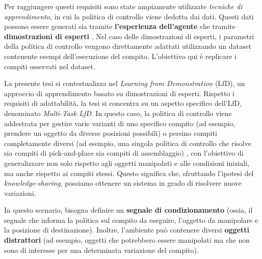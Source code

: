 Per raggiungere questi requisiti sono state ampiamente utilizzate \textit{tecniche di apprendimento}, in cui la politica di controllo viene dedotta dai dati. Questi dati possono essere generati sia tramite \textbf{l'esperienza dell'agente} \cite{sutton2018reinforcement} che tramite \textbf{dimostrazioni di esperti} \cite{osa2018algorithmic}.
Nel caso delle dimostrazioni di esperti, i parametri della politica di controllo vengono direttamente adattati utilizzando un dataset contenente esempi dell'esecuzione del compito. L'obiettivo qui è replicare i compiti osservati nel dataset.

La presente tesi si contestualizza nel \textit{Learning from Demonstration} (LfD), un approccio di apprendimento basato su dimostrazioni di esperti. Rispetto i requisiti di adattabilità, la tesi si concentra su un aspetto specifico dell'LfD, denominato \textit{Multi-Task LfD}. In questo caso, la politica di controllo viene addestrata per gestire varie varianti di uno specifico compito (ad esempio, prendere un oggetto da diverse posizioni possibili) \cite{dasari2021transformers_one_shot} o persino compiti completamente diversi (ad esempio, una singola politica di controllo che risolve sia compiti di pick-and-place sia compiti di assemblaggio) \cite{brohan2022rt,mandi2022towards_more_generalizable_one_shot}, con l'obiettivo di generalizzare non solo rispetto agli oggetti manipolati e alle condizioni iniziali, ma anche rispetto ai compiti stessi. Questo significa che, sfruttando l'ipotesi del \textit{knowledge-sharing}, possiamo ottenere un sistema in grado di risolvere nuove variazioni.


In questo scenario, bisogna definire un \textbf{segnale di condizionamento} (ossia, il segnale che informa la politica sul compito da eseguire, l'oggetto da manipolare e la posizione di destinazione). Inoltre, l'ambiente può contenere diversi \textbf{oggetti distrattori} (ad esempio, oggetti che potrebbero essere manipolati ma che non sono di interesse per una determinata variazione del compito).

